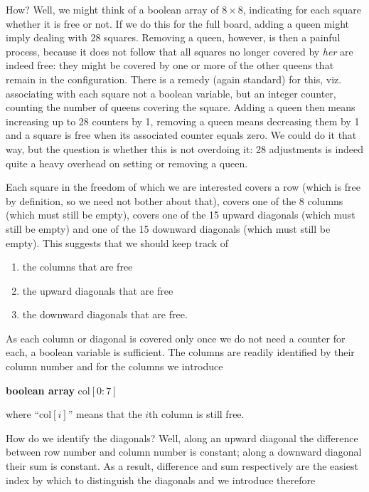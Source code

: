 How? Well, we might think of a boolean array of $8\times 8$, indicating for each square whether it is free or not. If we do this for the full board, adding a queen might imply dealing with 28 squares. Removing a queen, however, is then a painful process, because it does not follow that all squares no longer covered by \textit{her} are indeed free: they might be covered by one or more of the other queens that remain in the configuration. There is a remedy (again standard) for this, viz. associating with each square not a boolean variable, but an integer counter, counting the number of queens covering the square. Adding a queen then means increasing up to 28 counters by 1, removing a queen means decreasing them by 1 and a square is free when its associated counter equals zero. We could do it that way, but the question is whether this is not overdoing it: 28 adjustments is indeed quite a heavy overhead on setting or removing a queen.

Each square in the freedom of which we are interested covers a row (which is free by definition, so we need not bother about that), covers one of the 8 columns (which must still be empty), covers one of the 15 upward diagonals (which must still be empty) and one of the 15 downward diagonals (which must still be empty). This suggests that we should keep track of

\begin{enumerate}[leftmargin=2\parindent, label=(\arabic*)]
	\item the columns that are free
	\item the upward diagonals that are free
	\item the downward diagonals that are free.
\end{enumerate}

As each column or diagonal is covered only once we do not need a counter for each, a boolean variable is sufficient. The columns are readily identified by their column number and for the columns we introduce

\textbf{boolean array} col$[0:7]$

\noindent
where ``col$[i]$'' means that the $i$th column is still free.

How do we identify the diagonals? Well, along an upward diagonal the difference between row number and column number is constant; along a downward diagonal their sum is constant. As a result, difference and sum respectively are the easiest index by which to distinguish the diagonals and we introduce therefore

